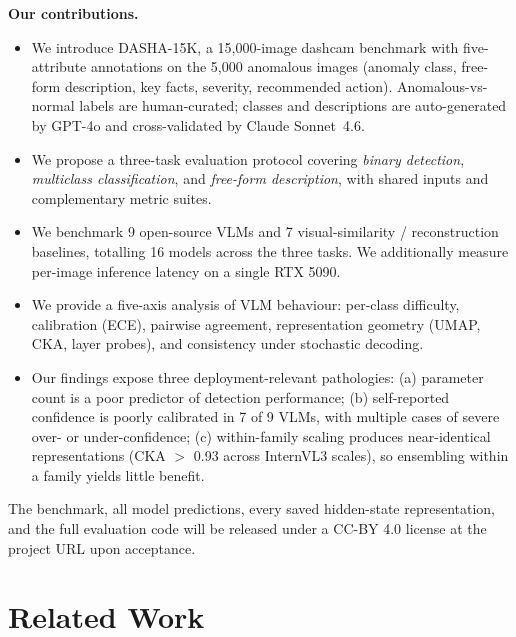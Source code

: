 \documentclass{article}
\newcommand{\bench}{\textsc{DASHA-15K}\xspace}
\begin{document}
\textbf{Our contributions.}
\begin{itemize}\setlength{\itemsep}{1pt}
  \item We introduce \bench, a 15{,}000-image dashcam benchmark with
        five-attribute annotations on the 5{,}000 anomalous
        images (anomaly class, free-form description, key facts,
        severity, recommended action). Anomalous-vs-normal labels are
        human-curated; classes and descriptions are auto-generated by
        GPT-4o and cross-validated by Claude Sonnet~4.6.
  \item We propose a three-task evaluation protocol covering
        \emph{binary detection}, \emph{multiclass classification}, and
        \emph{free-form description}, with shared inputs and
        complementary metric suites.
  \item We benchmark 9 open-source VLMs and 7 visual-similarity /
        reconstruction baselines, totalling 16 models across the three
        tasks. We additionally measure per-image inference latency on
        a single RTX 5090.
  \item We provide a five-axis analysis of VLM behaviour:
        per-class difficulty, calibration (ECE), pairwise agreement,
        representation geometry (UMAP, CKA, layer probes), and
        consistency under stochastic decoding.
  \item Our findings expose three deployment-relevant pathologies:
        (a) parameter count is a poor predictor of detection
        performance; (b) self-reported confidence is poorly calibrated
        in 7 of 9 VLMs, with multiple cases of severe over- or
        under-confidence; (c) within-family scaling produces
        near-identical representations (CKA $>$ 0.93 across InternVL3
        scales), so ensembling within a family yields little benefit.
\end{itemize}

The benchmark, all model predictions, every saved hidden-state
representation, and the full evaluation code will be released under
a CC-BY 4.0 license at the project URL upon acceptance.

\section{Related Work}
\label{sec:related}
\end{document}
